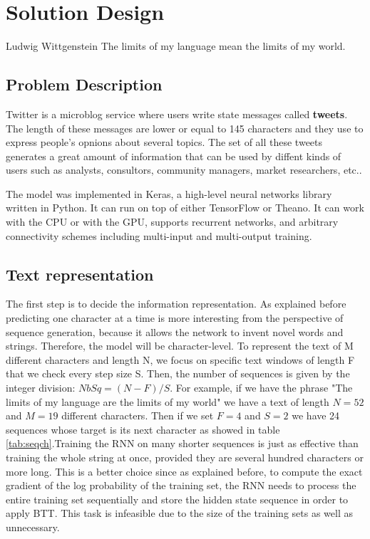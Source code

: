 \chapter{Solution Design}
\label{ch:design}

\begin{chapterquote}{Ludwig Wittgenstein}
	The limits of my language mean the limits of my world.
\end{chapterquote}

\section{Problem Description}

Twitter is a microblog service where users write state messages called \textbf{tweets}. The length of these messages are lower or equal to 145 characters and they use to express people's opnions about several topics. The set of all these tweets generates a great amount of information that can be used by diffent kinds of users such as analysts, consultors, community managers, market researchers, etc..

The model was implemented in Keras, a high-level neural networks library written in Python. It can run on top of either TensorFlow or Theano. It can work with the CPU or with the GPU, supports recurrent networks, and arbitrary connectivity schemes including multi-input and multi-output training. 

\section{Text representation}

The first step is to decide the information representation. As explained before predicting one character at a time is more interesting from the perspective of sequence generation, because it allows the network to invent novel words and strings. Therefore, the model will be character-level. To represent the text of M different characters and length N, we focus on specific text windows of length F that we check every step size S. Then, the number of sequences is given by the integer division: $NbSq=(N-F)/S$. For example, if we have the phrase "The limits of my language are the limits of my world" we have a text of length $N=52$ and $M=19$ different characters. Then if we set $F=4$ and $S=2$ we have 24 sequences whose target is its next character as showed in table \ref{tab:seqch}.Training the RNN on many shorter sequences is just as effective than training the whole string at once, provided they are several hundred characters or more long. This is a better choice since as explained before, to compute the exact gradient of the log probability of the training set, the RNN needs to process the entire training set sequentially and store the hidden state sequence in order to apply BTT. This task is infeasible due to the size of the training sets as well as unnecessary\cite{sutskever2011generating}.

